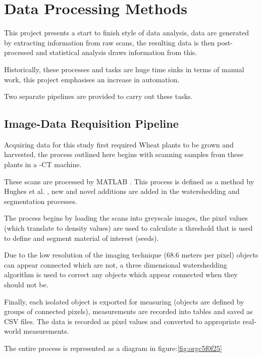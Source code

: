 \documentclass[11pt]{report}
\begin{document}
\section{Data Processing Methods}
\label{sec:orgcaf70ac}
This project presents a start to finish style of data analysis, data are generated by extracting information from raw scans, the resulting data is then post-processed and statistical analysis draws information from this.

Historically, these processes and tasks are huge time sinks in terms of manual work, this project emphasises an increase in automation.

Two separate pipelines are provided to carry out these tasks.

\subsection{Image-Data Requisition Pipeline}
\label{sec:orgc9d8796}

Acquiring data for this study first required Wheat plants to be grown and harvested, the process outlined here begins with scanning samples from these plants in a \textmu{}-CT machine.

These scans are processed by MATLAB \cite{MATHWORKS2017}. This process is defined as a method by Hughes et al. \cite{Hughes2017}, new and novel additions are added in the watershedding and segmentation processes.

The process begins by loading the scans into greyscale images, the pixel values (which translate to density values) are used to calculate a threshold that is used to define and segment material of interest (seeds).

Due to the low resolution of the imaging technique (68.6\textmu{} meters per pixel) objects can appear connected which are not, a three dimensional watershedding algorithm is used to correct any objects which appear connected when they should not be.

Finally, each isolated object is exported for measuring (objects are defined by groups of connected pixels), measurements are recorded into tables and saved as CSV files. The data is recorded as pixel values and converted to appropriate real-world measurements.

The entire process is represented as a diagram in figure:\ref{fig:orgc5f0f25}
\end{document}
